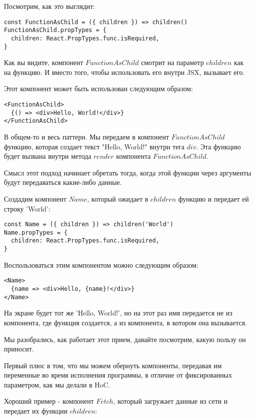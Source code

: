 Посмотрим, как это выглядит:

\begin{lstlisting}
const FunctionAsChild = ({ children }) => children()
FunctionAsChild.propTypes = {
  children: React.PropTypes.func.isRequired,
}
\end{lstlisting}

Как вы видите, компонент $FunctionAsChild$ смотрит на параметр $children$ как на функцию. И вместо того, чтобы использовать его внутри JSX, вызывает его.

Этот компонент может быть использован следующим образом:

\begin{lstlisting}
<FunctionAsChild>
  {() => <div>Hello, World!</div>}
</FunctionAsChild>
\end{lstlisting}

В общем-то и весь паттерн. Мы передаем в компонент $FunctionAsChild$ функцию, которая создает текст "Hello, World!" внутри тега $div$. Эта функцию будет вызвана внутри метода $render$ компонента $FunctionAsChild$.

Смысл этот подход начинает обретать тогда, когда этой функции через аргументы будут передаваться какие-либо данные.

Создадим компонент $Name$, который ожидает в $children$ функцию и передает ей строку 'World':

\begin{lstlisting}
const Name = ({ children }) => children('World')
Name.propTypes = {
  children: React.PropTypes.func.isRequired,
}
\end{lstlisting}

Воспользоваться этим компонентом можно следующим образом:

\begin{lstlisting}
<Name>
  {name => <div>Hello, {name}!</div>}
</Name>
\end{lstlisting}

На экране будет тот же 'Hello, World!', но на этот раз имя передается не из компонента, где функция создается, а из компонента, в котором она вызывается.

Мы разобрались, как работает этот прием, давайте посмотрим, какую пользу он приносит.

Первый плюс в том, что мы можем обернуть компоненты, передавая им переменные во время исполнения программы, в отличие от фиксированных параметром, как мы делали в HoC.

Хороший пример - компонент $Fetch$, который загружает данные из сети и передает их функции $children$:

